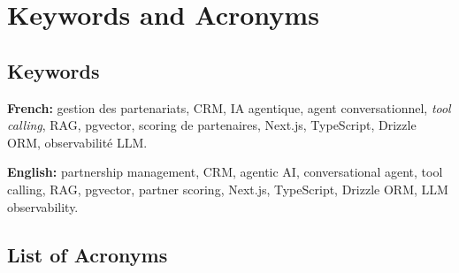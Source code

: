 \chapter*{Keywords and Acronyms}

\section*{Keywords}

\noindent\textbf{French:} gestion des partenariats, CRM, IA agentique, agent
conversationnel, \textit{tool calling}, RAG, pgvector, scoring de partenaires,
Next.js, TypeScript, Drizzle ORM, observabilité LLM.

\vspace{0.6em}
\noindent\textbf{English:} partnership management, CRM, agentic AI, conversational
agent, tool calling, RAG, pgvector, partner scoring, Next.js, TypeScript,
Drizzle ORM, LLM observability.

\section*{List of Acronyms}

